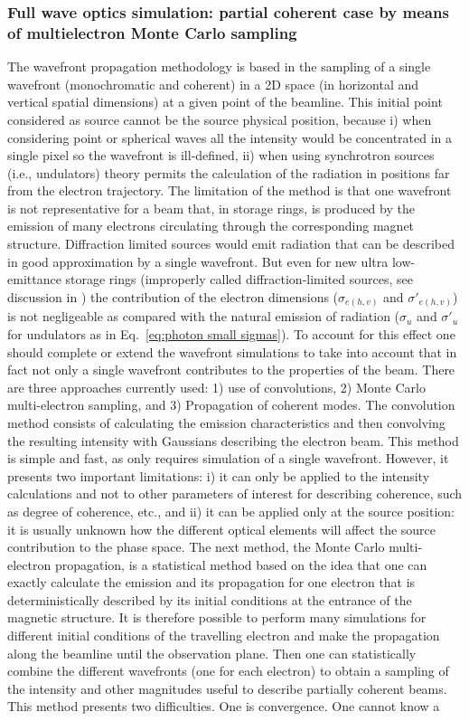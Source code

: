\documentclass{iucr}              %
\begin{document}
\subsubsection{Full wave optics simulation: partial coherent case by means of multielectron Monte Carlo sampling}
\label{srw_me}
The wavefront propagation methodology is based in the sampling of a single wavefront (monochromatic and coherent) in a 2D space (in horizontal and vertical spatial dimensions) at a given point of the beamline. This initial point considered as source cannot be the source physical position, because i) when considering point or spherical waves all the intensity would be concentrated in a single pixel so the wavefront is ill-defined, ii) when using synchrotron sources (i.e., undulators) theory \cite{jackson} permits the calculation of the radiation in positions far from the electron trajectory. The limitation of the method is that one wavefront is not representative for a beam that, in storage rings, is produced by the emission of many electrons circulating through the corresponding magnet structure. Diffraction limited sources would emit radiation that can be described in good approximation by a single wavefront. But even for new ultra low-emittance storage rings (improperly called diffraction-limited sources, see discussion in \cite{arxivCF}) the contribution of the electron dimensions ($\sigma_{e(h,v)}$ and $\sigma'_{e(h,v)}$) is not negligeable as compared with the natural emission of radiation ($\sigma_u$ and $\sigma'_u$ for undulators as in Eq.~\ref{eq:photon small sigmas}). To account for this effect one should complete or extend the wavefront simulations to take into account that in fact not only a single wavefront contributes to the properties of the beam. There are three approaches currently used: 1) use of convolutions, 2) Monte Carlo multi-electron sampling, and 3) Propagation of coherent modes. The convolution method consists of calculating the emission characteristics and then convolving the resulting intensity with Gaussians describing the electron beam. This method is simple and fast, as only requires simulation of a single wavefront. However, it presents two important limitations: i) it can only be applied to the intensity calculations and not to other parameters of interest for describing coherence, such as degree of coherence, etc., and ii) it can be applied only at the source position: it is usually unknown how the different optical elements will affect the source contribution to the phase space. The next method, the Monte Carlo multi-electron propagation,  is a statistical method based on the idea that one can exactly calculate the emission and its propagation for one electron that is deterministically described by its initial conditions at the entrance of the magnetic structure. It is therefore possible to perform many simulations for different initial conditions of the travelling electron and make the propagation along the beamline until the observation plane. Then one can statistically combine the different wavefronts (one for each electron) to obtain a sampling of the intensity and other magnitudes useful to describe partially coherent beams. This method presents two difficulties. One is convergence. One cannot know a 
\end{document}
